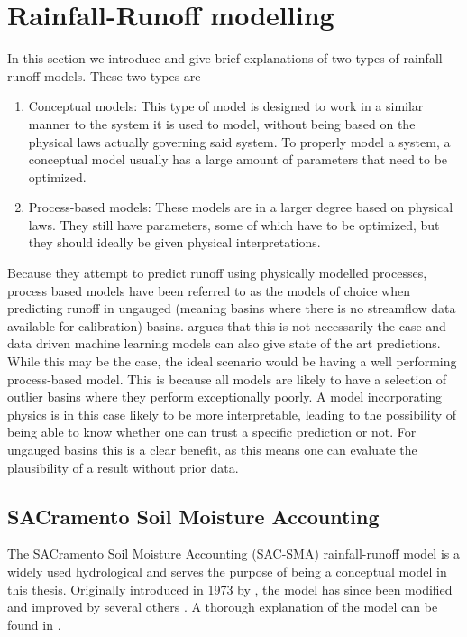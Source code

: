 \section{Rainfall-Runoff modelling}
In this section we introduce and give brief explanations of two types of 
rainfall-runoff models. These two types are
\begin{enumerate}
    \item Conceptual models: This type of model is designed to work in a similar 
manner to the system it is used to model, without being based on the physical laws 
actually governing said system. To properly model a system, a conceptual model 
usually has a large amount of parameters that need to be optimized.
	\item Process-based models: These models are in a larger degree based on physical 
		laws. They still have parameters, some of which have to be optimized, but 
they should ideally be given physical interpretations. 
\end{enumerate}
Because they attempt to predict runoff using physically modelled processes, process based models
have been referred to as the models of choice when predicting runoff in ungauged 
 (meaning basins where there is no streamflow data available for calibration) basins. 
 \citet{lstm_third_paper} argues that this is not necessarily the case and data driven 
 machine learning models can also give state of the art predictions.
 While this may be the case, the ideal scenario would be having 
 a well performing process-based model. This is because all models are likely to 
 have a selection of outlier basins where they perform exceptionally poorly. A model 
 incorporating physics is in this case likely to be more interpretable, leading 
 to the possibility of being able to know whether one can trust a specific prediction or not. 
 For ungauged basins this is a clear benefit, as this means one can evaluate 
 the plausibility of a result without prior data.
\subsection{SACramento Soil Moisture Accounting}
The SACramento Soil Moisture Accounting (SAC-SMA) rainfall-runoff model is a widely 
used hydrological and serves the purpose of being a conceptual model in this thesis.
Originally introduced in 1973 by \citet{SAC-SMA-old}, the model has since been modified and improved by 
several others \citep{SAC-SMA-physics}. A thorough explanation of 
the model can be found in \citet{SAC-SMA}.


